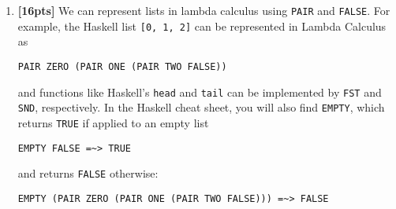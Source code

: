 \documentclass[paper=letter, fontsize=13pt]{article} %
\numberwithin{equation}{section} %
\newif\ifshowanswers\showanswerstrue
\begin{document}
\begin{enumerate}
\begin{enumerate}[label=(\Alph*)]
\item 
\verb|(\z x y -> x y (z y)) (\a -> a (\b c -> c) (\d e -> d)) (\f g -> g) (\h i -> i)|
\ifshowanswers
\begin{itemize}
\item \verb|(\x y -> x y ((\a -> a (\b c -> c) (\d e -> d)) y)) (\f g -> g) (\h i -> i)|
\item \verb|(\y -> (\f g -> g) y ((\a -> a (\b c -> c) (\d e -> d)) y)) (\h i -> i)|
\item \verb|((\f g -> g) (\h i -> i) ((\a -> a (\b c -> c) (\d e -> d)) (\h i -> i)))|
\item \verb|((\g -> g) ((\a -> a (\b c -> c) (\d e -> d)) (\h i -> i)))|
\item \verb|(\h i -> i) (\b c -> c) (\d e -> d)|
\item \verb|(\i -> i) (\d e -> d)|
\item \verb|(\d e -> d)|
\end{itemize}

Rubric:
\begin{itemize}
\item 0 pts : no attempt or nothing correct.
\item 1 pts : anything correct (e.g., one reduction)
\item 2-5 pts : more than one thing correct (e.g., two reductions), few things incorrect
\item 6 pts : almost correct, but one smallish error
\item 7 pts : completely correct
\end{itemize}
\else
\bigskip
\bigskip
\bigskip
\bigskip
\bigskip
\bigskip
\bigskip
\bigskip
\bigskip
\bigskip
\bigskip
\bigskip
\bigskip
\bigskip
\bigskip
\bigskip
\fi
\end{enumerate}
\newpage

\item \textbf{[16pts]}  
We can represent lists in lambda calculus using \texttt{PAIR} and \texttt{FALSE}.
For example, the Haskell list \texttt{[0, 1, 2]} can be represented in Lambda Calculus
as 
\begin{verbatim}
PAIR ZERO (PAIR ONE (PAIR TWO FALSE))
\end{verbatim}
and functions like Haskell's \texttt{head} and \texttt{tail} can be implemented by \texttt{FST} 
and \texttt{SND}, respectively. In the Haskell cheat sheet, you will also find \texttt{EMPTY}, 
which returns \texttt{TRUE} if applied to an empty list 
\begin{verbatim}
EMPTY FALSE =~> TRUE
\end{verbatim}
and returns \texttt{FALSE} otherwise:
\begin{verbatim}
EMPTY (PAIR ZERO (PAIR ONE (PAIR TWO FALSE))) =~> FALSE
\end{verbatim}


\end{enumerate}
\end{document}
